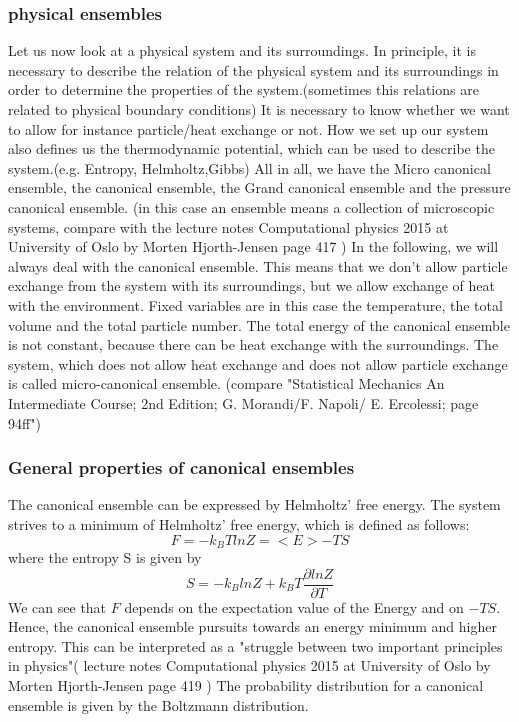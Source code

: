 \documentclass[10pt,a4paper]{article}
\begin{document}
\subsubsection{physical ensembles}
Let us now look at a physical system and its surroundings. 
In principle, it is necessary to describe the relation of the physical system and its surroundings in order to determine the properties of the system.(sometimes this relations are related to physical boundary conditions) It is necessary to know whether we want to allow for instance particle/heat exchange or not. How we set up our system also defines us the thermodynamic potential, which can be used to describe the system.(e.g. Entropy, Helmholtz,Gibbs) All in all, we have the Micro canonical ensemble, the canonical ensemble, the Grand canonical ensemble and the pressure canonical ensemble. (in this case an ensemble means a collection of microscopic systems, compare with the lecture notes Computational physics 2015 at University of Oslo by Morten Hjorth-Jensen page 417 )
In the following, we will always deal with the canonical ensemble. This  means that we don't allow particle exchange from the system with its surroundings, but we allow exchange of heat with the environment. 
Fixed variables are in this case the temperature, the total volume and the total particle number. The total energy of the canonical ensemble is not constant, because there can be heat exchange with the surroundings. The system, which does not allow heat exchange and does not allow particle exchange is called micro-canonical ensemble. (compare "Statistical Mechanics  An Intermediate Course; 2nd Edition; G. Morandi/F. Napoli/ E. Ercolessi; page 94ff") 


\subsubsection{General properties of canonical ensembles}\label{General properties of canonical ensembles}
The canonical ensemble can be expressed by Helmholtz' free energy. The system strives to a minimum of Helmholtz' free energy, which is defined as follows:
\begin{equation}
F=-k_BTlnZ = <E>-TS \label{F}
\end{equation}
where the entropy S is given by
\begin{equation}
S=-k_BlnZ + k_B T \frac{\partial lnZ}{\partial T}\label{S}
\end{equation}
We can see that $F$ depends on the expectation value of the Energy and on $-TS$. 
Hence, the canonical ensemble pursuits towards an energy minimum and higher entropy. This can be interpreted as a "struggle between two important principles in physics"( lecture notes Computational physics 2015 at University of Oslo by Morten Hjorth-Jensen page 419 )
The probability distribution for a canonical ensemble is given by the Boltzmann distribution.
\end{document}
